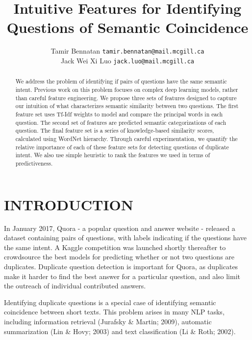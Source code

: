 \documentclass[letterpaper, 10 pt, conference]{ieeeconf}  %
\title{\LARGE \bf
Intuitive Features for Identifying Questions of Semantic Coincidence
}
\author{ \parbox{3 in}{\centering Tamir Bennatan
         {\tt\small tamir.bennatan@mail.mcgill.ca}}
         \hspace*{ 0.5 in}
         \parbox{3 in}{ \centering Jack Wei Xi Luo
         \break
         {\tt\small jack.luo@mail.mcgill.ca}}
}
\begin{document}
\maketitle
\thispagestyle{empty}
\pagestyle{empty}


\begin{abstract}

We address the problem of identifying if pairs of questions have the same semantic intent. Previous work on this problem focuses on complex deep learning models, rather than careful feature engineering. We propose three sets of features designed to capture our intuition of what characterizes semantic similarity between two questions. The first feature set uses Tf-Idf weights to model and compare the principal words in each question. The second set of features are predicted semantic categorizations of each question. The final feature set is a series of knowledge-based similarity scores, calculated using WordNet hierarchy. Through careful experimentation, we quantify the relative importance of each of these feature sets for detecting questions of duplicate intent. We also use simple heuristic to rank the features we used in terms of predictiveness. 

\end{abstract}


\section{INTRODUCTION}

In January 2017, Quora - a popular question and answer website - released a dataset containing pairs of questions, with labels indicating if the questions have the same intent. A Kaggle competition was launched shortly thereafter to crowdsource the best models for predicting whether or not two questions are duplicates. Duplicate question detection is important for Quora, as duplicates make it harder to find the best answer for a particular question, and also limit the outreach of individual contributed answers.

Identifying duplicate questions is a special case of identifying semantic coincidence between short texts. This problem arises in many NLP tasks, including information retrieval (Jurafsky \& Martin; 2009), automatic summarization (Lin \& Hovy; 2003) and text classification (Li \& Roth; 2002). 
\end{document}
